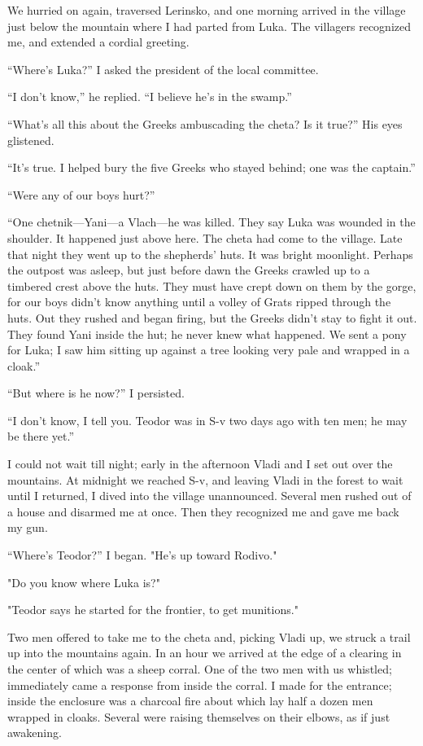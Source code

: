 \documentclass[a5paper,12pt]{book}
\begin{document}
We hurried on again, traversed Lerinsko, and one morning arrived in the village just below the mountain where I had parted from Luka. The villagers recognized me, and extended a cordial greeting. 

“Where’s Luka?” I asked the president of the local committee. 

“I don’t know,” he replied. “I believe he’s in the swamp.”

“What’s all this about the Greeks ambuscading the cheta? Is it true?” His eyes glistened. 

“It’s true. I helped bury the five Greeks who stayed behind; one was the captain.”

“Were any of our boys hurt?”

“One chetnik—Yani—a Vlach—he was killed. They say Luka was wounded in the shoulder. It happened just above here. The cheta had come to the village. Late that night they went up to the shepherds’ huts. It was bright moonlight. Perhaps the outpost was asleep, but just before dawn the Greeks crawled up to a timbered crest above the huts. They must have crept down on them by the gorge, for our boys didn’t know anything until a volley of Grats ripped through the huts. Out they rushed and began firing, but the Greeks didn’t stay to fight it out. They found Yani inside the hut; he never knew what happened. We sent a pony for Luka; I saw him sitting up against a tree looking very pale and wrapped in a cloak.”

“But where is he now?” I persisted. 

“I don’t know, I tell you. Teodor was in S-v two days ago with ten men; he may be there yet.”

I could not wait till night; early in the afternoon Vladi and I set out over the mountains. At midnight we reached S-v, and leaving Vladi in the forest to wait until I returned, I dived into the village unannounced. Several men rushed out of a house and disarmed me at once. Then they recognized me and gave me back my gun. 

“Where’s Teodor?” I began.
"He’s up toward Rodivo." 

"Do you know where Luka is?" 

"Teodor says he started for the frontier, to get munitions." 

Two men offered to take me to the cheta and, picking Vladi up, we struck a trail up into the mountains again. In an hour we arrived at the edge of a clearing in the center of which was a sheep corral. One of the two men with us whistled; immediately came a response from inside the corral. I made for the entrance; inside the enclosure was a charcoal fire about which lay half a dozen men wrapped in cloaks. Several were raising themselves on their elbows, as if just awakening. 
\end{document}
